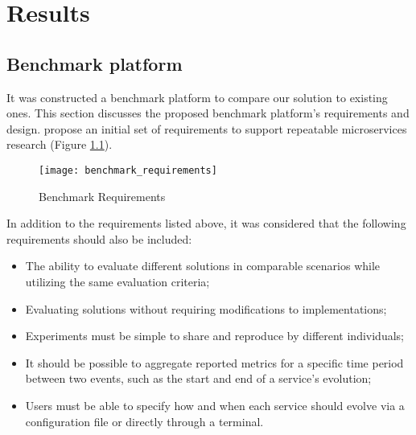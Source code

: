 
%

\chapter{Results}
\label{cha:results}

\section{Benchmark platform} %
\label{sec:benchmark_platform}

It was constructed a benchmark platform to compare our solution to existing ones.
This section discusses the proposed benchmark platform's requirements and design.
\citeauthor{microservices2017benchmark} \cite{microservices2017benchmark} propose an initial set of requirements
to support repeatable microservices research (Figure \ref{fig:benchmark}).

\begin{figure}[htbp]
    \centering
    \centerline{\texttt{[image: benchmark\_requirements]}}
    \caption{Benchmark Requirements \cite{microservices2017benchmark}}
    \label{fig:benchmark}
\end{figure}

In addition to the requirements listed above, it was considered that the following requirements should also be included:
\begin{itemize}
    \setlength\itemsep{0em}
    \item The ability to evaluate different solutions in comparable scenarios while utilizing the same evaluation criteria;
    \item Evaluating solutions without requiring modifications to implementations;
    \item Experiments must be simple to share and reproduce by different individuals;
    \item It should be possible to aggregate reported metrics for a specific time period between two events, such as the start and end of a service's evolution;
    \item Users must be able to specify how and when each service should evolve via a configuration file or directly through a terminal.
\end{itemize}

